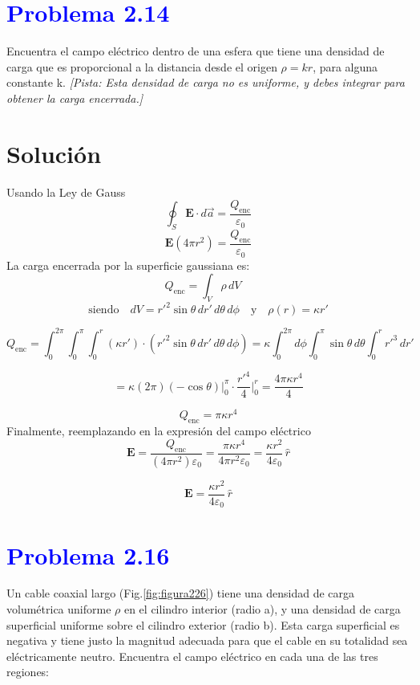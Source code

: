 \documentclass[12pt]{article}
\begin{document}
\section*{\textcolor{blue}{Problema 2.14}}

Encuentra el campo eléctrico dentro de una esfera que tiene una densidad de carga que es proporcional a la distancia desde el origen \(\rho = kr\), para alguna constante k.
\textit{[Pista: Esta densidad de carga no es uniforme, y debes integrar para obtener la carga encerrada.]}


\section*{Solución}

Usando la Ley de Gauss \[\oint_S \mathbf{E} \cdot d\vec{a} = \frac{Q_{\text{enc}}}{\varepsilon_0}
\]
\[
\textbf{E}(4\pi r^2) = \frac{Q_{\text{enc}}}{\varepsilon_0}
\]
La carga encerrada por la superficie gaussiana es:
\[
Q_{\text{enc}} = \int_V \rho \, dV \quad 
\]
\[
\text{siendo} \quad dV = r'^2 \sin\theta \, dr' \, d\theta \, d\phi
\quad \text{y} \quad \rho(r) = \kappa r'
\]

\[
Q_{\text{enc}} = \int_0^{2\pi} \int_0^{\pi} \int_0^r (\kappa r') \cdot (r'^2 \sin\theta \, dr' \, d\theta \, d\phi )
= \kappa \int_0^{2\pi} d\phi \int_0^{\pi} \sin\theta \, d\theta \int_0^r r'^3 \, dr'
\]

\[
= \kappa (2\pi)(-\cos\theta)\Big|_0^{\pi} \cdot \frac{r'^4}{4} \Big|_0^{r}
= \frac{4\pi \kappa r^4}{4}
\]

\[
Q_{\text{enc}} = \pi \kappa r^4
\]
Finalmente, reemplazando en la expresión del campo eléctrico
\[
\mathbf{E}  
= \frac{Q_{\text{enc}}}{(4\pi r^2)\varepsilon_0} 
= \frac{\pi \kappa r^4}{4\pi r^2 \varepsilon_0}
= \frac{\kappa r^2}{4\varepsilon_0} \, \hat{r}
\]

\[
\boxed{\mathbf{E} = \frac{\kappa r^2}{4\varepsilon_0} \, \hat{r}}
\]


\section*{\textcolor{blue}{Problema 2.16}}


Un cable coaxial largo (Fig.\ref{fig:figura226}) tiene una densidad de carga volumétrica uniforme \(\rho \) en el cilindro interior (radio a), y una densidad de carga superficial uniforme sobre el cilindro exterior (radio b). Esta carga superficial es negativa y tiene justo la magnitud adecuada para que el cable en su totalidad sea eléctricamente neutro.
Encuentra el campo eléctrico en cada una de las tres regiones:
\end{document}
